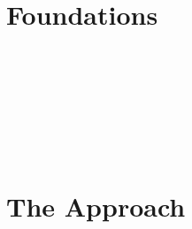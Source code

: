 \documentclass[12pt,oneside]{book}
\begin{document}
\newtheorem*{mydef}{Definition}






\newpage \ %
\part{Foundations}

%

\newpage\ 


\newpage\ 


\newpage\ 


\newpage\ %
\part{The Approach}
\newpage\ 

\end{document}
